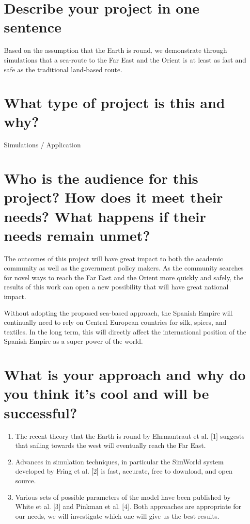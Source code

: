 \documentclass{proc}
\begin{document}
\section{Describe your project in one sentence}

Based on the assumption that the Earth is round, we demonstrate through simulations that a sea-route to the Far East and the Orient is at least as fast and safe as the traditional land-based route.

\section{What type of project is this and why?}

Simulations / Application

\section{Who is the audience for this project? How does it meet their needs? What happens if their needs remain unmet?}

The outcomes of this project will have great impact to both the academic community as well as the government policy makers.
As the community searches for novel ways to reach the Far East and the Orient more quickly and safely, the results of this work can open a new possibility that will have great national impact.

Without adopting the proposed sea-based approach, the Spanish Empire will continually need to rely on Central European countries for silk, spices, and textiles.
In the long term, this will directly affect the international position of the Spanish Empire as a super power of the world.

\section{What is your approach and why do you think it’s cool and will be successful?}

\begin{enumerate}
\item The recent theory that the Earth is round by Ehrmantraut et al. [1] suggests that sailing towards the west will eventually reach the Far East.
\item Advances in simulation techniques, in particular the SimWorld system developed by Fring et al. [2] is fast, accurate, free to download, and open source.
\item Various sets of possible parameters of the model have been published by White et al. [3] and Pinkman et al. [4]. Both approaches are appropriate for our needs, we will investigate which one will give us the best results.
\end{enumerate}
\end{document}
